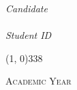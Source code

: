 \begin{titlepage}
\begin{center}
\begin{large}
            \begin{flushright}
                \textit{Candidate}\\
                \vspace{5pt}
                \myName \\
                \vspace{5pt}
                \textit{Student ID} \myID
            \end{flushright}
        \end{large}

        \vspace{40pt}

        \line(1, 0){338} \\
        \begin{normalsize}
            \textsc{Academic Year \myAA}
        \end{normalsize}
    \end{center}
\end{titlepage}
